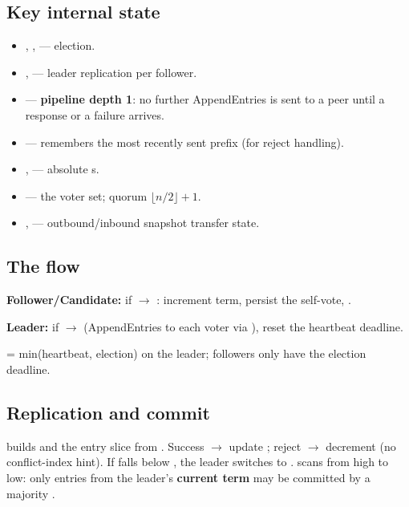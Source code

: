 \subsection{Key internal state}

\begin{itemize}[nosep]
  \item {}, ,  --- election.
  \item {},  --- leader replication per follower.
  \item {} --- \textbf{pipeline depth 1}: no further AppendEntries is sent to a peer until a response or a failure arrives.
  \item {} --- remembers the most recently sent prefix (for reject handling).
  \item {},  --- absolute s.
  \item {} --- the voter set; quorum $\lfloor n/2 \rfloor + 1$.
  \item {},  --- outbound/inbound snapshot transfer state.
\end{itemize}

\subsection{The  flow}

\textbf{Follower/Candidate:} if  $\rightarrow$ : increment term, persist the self-vote, .

\textbf{Leader:} if  $\rightarrow$  (AppendEntries to each voter via ), reset the heartbeat deadline.

 = min(heartbeat, election) on the leader; followers only have the election deadline.

\subsection{Replication and commit}

 builds  and the entry slice from . Success $\rightarrow$ update ; reject $\rightarrow$ decrement  (no conflict-index hint). If  falls below , the leader switches to .  scans from high to low: only entries from the leader's \textbf{current term} may be committed by a majority .

